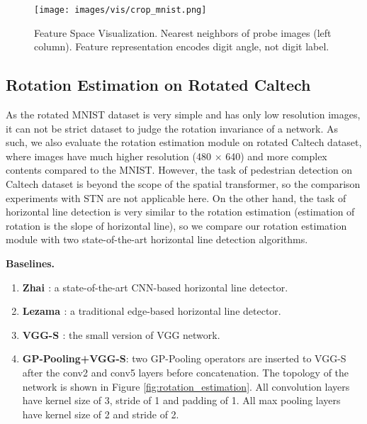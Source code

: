 \documentclass[10pt,twocolumn,letterpaper]{article}
\begin{document}
\begin{figure}[tb]
    \centering
    \texttt{[image: images/vis/crop\_mnist.png]}
    \caption{Feature Space Visualization. Nearest neighbors of probe images (left column). Feature representation encodes digit angle, not digit label.}
    \label{fig:nn_vis_mnist}
    \vspace{-0.3cm}
\end{figure}


\subsection{Rotation Estimation on Rotated Caltech}
As the rotated MNIST dataset is very simple and has only low resolution images, it can not be strict dataset to judge the rotation invariance of a network. As such, we also evaluate the rotation estimation module on rotated Caltech dataset, where images have much higher resolution (480 $\times$ 640) and more complex contents compared to the MNIST. However, the task of pedestrian detection on Caltech dataset is beyond the scope of the spatial transformer, so the comparison experiments with STN are not applicable here. On the other hand, the task of horizontal line detection is very similar to the rotation estimation (estimation of rotation is the slope of horizontal line), so we compare our rotation estimation module with two state-of-the-art horizontal line detection algorithms. 

\vspace{1mm}\noindent\textbf{Baselines.}
\vspace{-0.2cm}
\begin{enumerate}
    \setlength\topsep{-1mm}
    \setlength\itemsep{-1.5mm}
    \item \textbf{Zhai \etal \cite{Zhai2016}}: a state-of-the-art CNN-based horizontal line detector.
    \item \textbf{Lezama \etal \cite{Lezama2014}}: a traditional edge-based horizontal line detector.
    \item \textbf{VGG-S \cite{Simonyan2014}}: the small version of VGG network.
    \item \textbf{GP-Pooling+VGG-S}: two GP-Pooling operators are inserted to VGG-S after the conv2 and conv5 layers before concatenation. The topology of the network is shown in Figure \ref{fig:rotation_estimation}. All convolution layers have kernel size of 3, stride of 1 and padding of 1. All max pooling layers have kernel size of 2 and stride of 2.
    \end{enumerate}
\vspace{-0.2cm}
\end{document}
